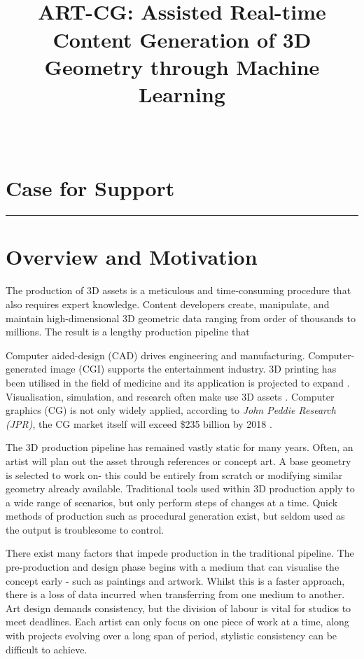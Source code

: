 \documentclass[a4paper, fontsize=15pt, onecolumn]{article} %
\title{
	\vspace{-3.0cm}
	\horrule{0.4pt} \\[0.2cm] %
	\vspace{0.2cm}
	\Large ART-CG: Assisted Real-time Content Generation of 3D Geometry through Machine Learning\\
	\horrule{0.4pt} \\[0cm] %
	\vspace{-0.5cm}
}
\date{} %
\numberwithin{equation}{section} %
\numberwithin{figure}{section} %
\numberwithin{table}{section} %
\begin{document}
\maketitle
\thispagestyle{fancy} %

\section*{Case for Support}
\hrule
\section{Overview and Motivation}
The production of 3D assets is a meticulous and time-consuming procedure that also requires expert knowledge. Content developers create, manipulate, and maintain high-dimensional 3D geometric data ranging from order of thousands to millions. The result is a lengthy production pipeline that 

Computer aided-design (CAD) drives engineering and manufacturing.
Computer-generated image (CGI) supports the entertainment industry.
3D printing has been utilised in the field of medicine and its application is projected to expand \cite{3dprinting}.
Visualisation, simulation, and research often make use 3D assets \cite{simulation}.
Computer graphics (CG) is not only widely applied, according to \textit{John Peddie Research (JPR)}, the CG market itself will exceed \$235 billion by 2018 \cite{cgmarket}.

The 3D production pipeline has remained vastly static for many years. Often, an artist will plan out the asset through references or concept art. A base geometry is selected to work on- this could be entirely from scratch or modifying similar geometry already available. Traditional tools used within 3D production apply to a wide range of scenarios, but only perform steps of changes at a time. 
Quick methods of production such as procedural generation exist, but seldom used as the output is troublesome to control.

There exist many factors that impede production in the traditional pipeline. The pre-production and design phase begins with a medium that can visualise the concept early - such as paintings and artwork. Whilst this is a faster approach, there is a loss of data incurred when transferring from one medium to another. Art design demands consistency, but the division of labour is vital for studios to meet deadlines. Each artist can only focus on one piece of work at a time, along with projects evolving over a long span of period, stylistic consistency can be difficult to achieve. 
\end{document}
